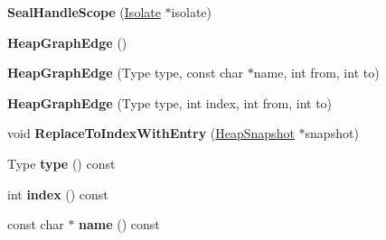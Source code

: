 \begin{DoxyCompactItemize}
\item 
\hypertarget{classv8_1_1internal_1_1_b_a_s_e___e_m_b_e_d_d_e_d_aa82defd61d9d54912fc43646cc65bf7e}{}{\bfseries Seal\+Handle\+Scope} (\hyperlink{classv8_1_1internal_1_1_isolate}{Isolate} $\ast$isolate)\label{classv8_1_1internal_1_1_b_a_s_e___e_m_b_e_d_d_e_d_aa82defd61d9d54912fc43646cc65bf7e}

\item 
\hypertarget{classv8_1_1internal_1_1_b_a_s_e___e_m_b_e_d_d_e_d_abfb5b377b85af30dbf51905018babbae}{}{\bfseries Heap\+Graph\+Edge} ()\label{classv8_1_1internal_1_1_b_a_s_e___e_m_b_e_d_d_e_d_abfb5b377b85af30dbf51905018babbae}

\item 
\hypertarget{classv8_1_1internal_1_1_b_a_s_e___e_m_b_e_d_d_e_d_a8effbfbe025e4aac94e79313e226767c}{}{\bfseries Heap\+Graph\+Edge} (Type type, const char $\ast$name, int from, int to)\label{classv8_1_1internal_1_1_b_a_s_e___e_m_b_e_d_d_e_d_a8effbfbe025e4aac94e79313e226767c}

\item 
\hypertarget{classv8_1_1internal_1_1_b_a_s_e___e_m_b_e_d_d_e_d_a2c8b45bc3dd356019332e4edbdce0dce}{}{\bfseries Heap\+Graph\+Edge} (Type type, int index, int from, int to)\label{classv8_1_1internal_1_1_b_a_s_e___e_m_b_e_d_d_e_d_a2c8b45bc3dd356019332e4edbdce0dce}

\item 
\hypertarget{classv8_1_1internal_1_1_b_a_s_e___e_m_b_e_d_d_e_d_a25cac79ae7e67c3e61a3be6478c7f68d}{}void {\bfseries Replace\+To\+Index\+With\+Entry} (\hyperlink{classv8_1_1internal_1_1_heap_snapshot}{Heap\+Snapshot} $\ast$snapshot)\label{classv8_1_1internal_1_1_b_a_s_e___e_m_b_e_d_d_e_d_a25cac79ae7e67c3e61a3be6478c7f68d}

\item 
\hypertarget{classv8_1_1internal_1_1_b_a_s_e___e_m_b_e_d_d_e_d_af98803058cf036665f3ce080428503e3}{}Type {\bfseries type} () const \label{classv8_1_1internal_1_1_b_a_s_e___e_m_b_e_d_d_e_d_af98803058cf036665f3ce080428503e3}

\item 
\hypertarget{classv8_1_1internal_1_1_b_a_s_e___e_m_b_e_d_d_e_d_a96c5297cf77a89dca171ef93fcd51b01}{}int {\bfseries index} () const \label{classv8_1_1internal_1_1_b_a_s_e___e_m_b_e_d_d_e_d_a96c5297cf77a89dca171ef93fcd51b01}

\item 
\hypertarget{classv8_1_1internal_1_1_b_a_s_e___e_m_b_e_d_d_e_d_aa902f4e67ef51143901a2fced6f4a23f}{}const char $\ast$ {\bfseries name} () const \label{classv8_1_1internal_1_1_b_a_s_e___e_m_b_e_d_d_e_d_aa902f4e67ef51143901a2fced6f4a23f}


\end{DoxyCompactItemize}

